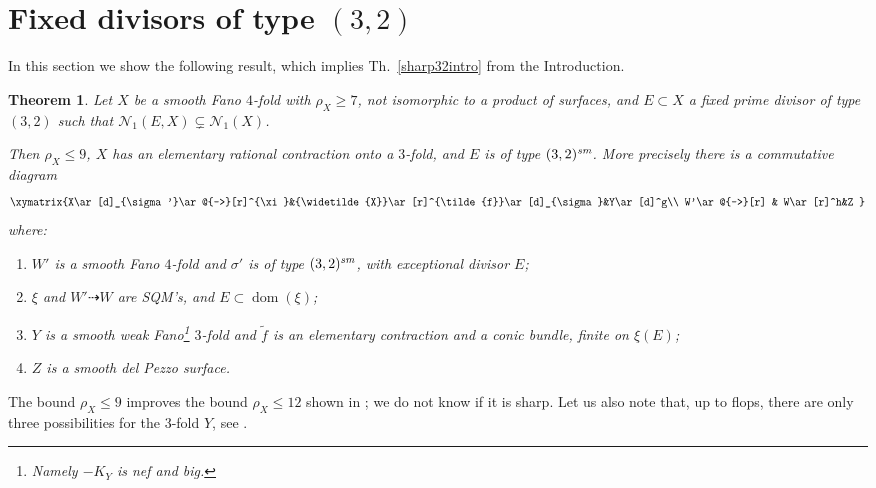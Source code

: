 \documentclass[a4paper,12pt]{amsart}
\newtheorem{thm}{Theorem}[section]
\theoremstyle{definition}
\numberwithin{figure}{section}
\numberwithin{table}{section}
\newcommand{\w}{\widetilde}
\newcommand{\N}{\mathcal{N}_1}
\newcommand{\dom}{\operatorname{dom}}
\newcommand{\sm}{\text{\it sm}}
\begin{document}
\section{Fixed divisors of type $(3,2)$}\label{sec32}
\noindent In this section we show the following result, which implies Th.~\ref{sharp32intro} from the Introduction.
\begin{thm}\label{sharp32}
  Let $X$ be a smooth Fano $4$-fold with $\rho_X\geq 7$, not isomorphic to a product of surfaces, and $E\subset X$ a fixed prime divisor of type $(3,2)$ such that $\N(E,X)\subsetneq\N(X)$.

  Then $\rho_X\leq 9$,
  $X$ has an elementary rational contraction onto a  $3$-fold, and $E$ is of type $(3,2)^{\sm}$. More precisely there is a commutative diagram 
\begin{equation}\label{cavour} \xymatrix{X\ar[d]_{\sigma'}\ar@{-->}[r]^{\xi}&{\w{X}}\ar[r]^{\tilde{f}}\ar[d]_{\sigma}&Y\ar[d]^g\\
W'\ar@{-->}[r] & W\ar[r]^h&Z
}
\end{equation}
where:
\begin{enumerate}[$\bullet$]
\item $W'$ is a smooth Fano $4$-fold and $\sigma'$ is  of type $(3,2)^{\sm}$,
  with exceptional divisor $E$;
\item $\xi$ and $W'\dasharrow W$ are SQM's, and $E\subset\dom(\xi)$;
\item $Y$ is a smooth weak Fano\footnote{Namely $-K_Y$ is nef and big.} $3$-fold and $\tilde{f}$ is an elementary contraction and a conic bundle, finite on $\xi(E)$;
\item
  $Z$ is a smooth del Pezzo surface.
  \end{enumerate}
\end{thm}
The bound $\rho_X\leq 9$ improves the bound $\rho_X\leq 12$ shown in \cite[Prop.~5.32]{blowup};
we do not know if it is sharp.
Let us also note that, up to flops, there are only three possibilities for the $3$-fold $Y$, see \cite[Cor.~6.4]{3folds}.
\end{document}
